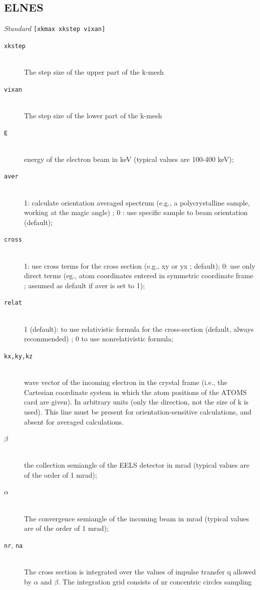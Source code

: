 \documentclass[11pt,oneside]{report} %
\renewcommand{\htmlref}[2]{\hyperlink{#2}{#1}}
\newenvironment{Card}[4]%
      {\vspace{3ex}%
        \subsection{#1}
        \quad\textsl{#3}\newline
        \quad\texttt{#2}\newline%
        \label{card:#4}\\}
      {}
\renewcommand{\htmlref}[2]{{#1}} %
\begin{document}
\begin{Card}{ELNES}{[xkmax xkstep vixan]}{Standard}{eln}
\begin{description}
  \item[\texttt{xkstep}]\hfill\\ 
    The step size of the upper part of the k-mesh
  \item[\texttt{vixan}]\hfill\\ 
    The step size of the lower part of the k-mesh
  \item[\texttt{E}]\hfill\\ 
    energy of the electron beam in keV (typical values are 100-400 keV);
  \item[\texttt{aver}]\hfill\\ 
    1: calculate orientation averaged spectrum (e.g., a polycrystalline 
    sample, working at the magic angle) ; 0 : use specific sample to beam 
    orientation (default);
  \item[\texttt{cross}]\hfill\\
    1: use cross terms for the cross section (e.g., xy or yx ; default); 0: use 
    only direct terms (eg., atom coordinates entered in symmetric coordinate 
    frame ; assumed as default if aver is set to 1);
  \item[\texttt{relat}]\hfill\\ 
    1 (default): to use relativistic formula for the cross-section (default, 
    always recommended) ; 0 to use nonrelativistic formula;
  \item[\texttt{kx,ky,kz}]\hfill\\ 
    wave vector of the incoming electron in the crystal frame (i.e., the 
    Cartesian coordinate system in which the atom positions of the
    \htmlref{ATOMS}{card:ato} card are given).  In arbitrary units (only the 
    direction, not the size of k is used). This line must be present for 
    orientation-sensitive calculations, and absent for averaged calculations.
  \item[$\mathtt{\beta}$]\hfill\\
    the collection semiangle of the EELS detector in mrad (typical values are of
    the order of 1 mrad);
  \item[$\mathtt{\alpha}$]\hfill\\ 
    The convergence semiangle of the incoming beam in mrad (typical values are of
    the order of 1 mrad); 
  \item[\texttt{nr}, \texttt{na}]\hfill\\
    The cross section is integrated over the values of impulse transfer q allowed by $\alpha$ 
    and $\beta$.  The integration grid consists of nr concentric circles sampling 

\end{description}
\end{Card}
\end{document}
